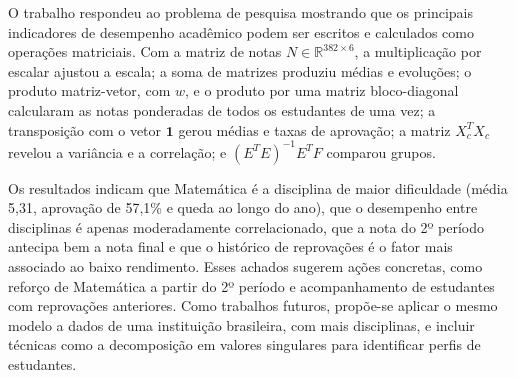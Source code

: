 \documentclass[12pt,a4paper]{article}
\newcommand{\R}{\mathbb{R}}
\begin{document}
O trabalho respondeu ao problema de pesquisa mostrando que os principais indicadores de desempenho acadêmico podem ser escritos e calculados como operações matriciais. Com a matriz de notas $N\in\R^{382\times 6}$, a multiplicação por escalar ajustou a escala; a soma de matrizes produziu médias e evoluções; o produto matriz-vetor, com $w$, e o produto por uma matriz bloco-diagonal calcularam as notas ponderadas de todos os estudantes de uma vez; a transposição com o vetor $\mathbf{1}$ gerou médias e taxas de aprovação; a matriz $X_c^TX_c$ revelou a variância e a correlação; e $(E^TE)^{-1}E^TF$ comparou grupos.

Os resultados indicam que Matemática é a disciplina de maior dificuldade (média 5,31, aprovação de 57,1\% e queda ao longo do ano), que o desempenho entre disciplinas é apenas moderadamente correlacionado, que a nota do 2º período antecipa bem a nota final e que o histórico de reprovações é o fator mais associado ao baixo rendimento. Esses achados sugerem ações concretas, como reforço de Matemática a partir do 2º período e acompanhamento de estudantes com reprovações anteriores. Como trabalhos futuros, propõe-se aplicar o mesmo modelo a dados de uma instituição brasileira, com mais disciplinas, e incluir técnicas como a decomposição em valores singulares para identificar perfis de estudantes.

\end{document}

